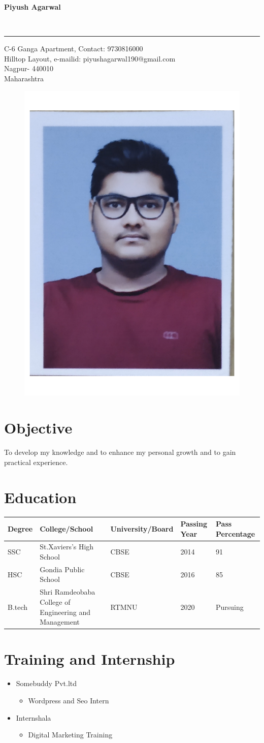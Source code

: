 \documentclass{article}
\begin{document}
	
{\begin{center}
		
	\end{center}\Huge\textbf{Piyush Agarwal}}
\\
\rule{\paperwidth}{0.2ex}
C-6 Ganga Apartment,\hspace{24ex} Contact: 9730816000
\\
Hilltop Layout, \hspace{32ex} e-mailid: piyushagarwal190@gmail.com
\\
Nagpur- 440010 
\\
Maharashtra
\begin{flushright}
	\begin{figure}[h]
		\includegraphics[width=15ex]{PIYUSH7}
	\end{figure}
\end{flushright}
\section{Objective}
{\large To develop my knowledge and to enhance my personal growth and to gain practical experience.}
\section{Education}
\begin{tabular}{ |p{3cm}|p{3cm}|p{3cm}|p{2cm}|p{3cm}| }
	\hline
	Degree& College/School &University/Board &Passing Year &Pass Percentage 
	\\
	\hline
	\hline
	SSC & St.Xaviers's High School &CBSE &2014 &91 \\
	\hline
	HSC & Gondia Public School   & CBSE &2016 &85 \\
	\hline
	B.tech &Shri Ramdeobaba College of Engineering and Management & RTMNU &2020 &Pursuing \\
	\hline
\end{tabular}
\section{Training and Internship}
\begin{itemize}
	\item{ Somebuddy Pvt.ltd
		\begin{itemize}
			\item Wordpress and Seo Intern
	\end{itemize}}
	\item { Internshala
		\begin{itemize}
			\item Digital Marketing Training
	\end{itemize}}
\end{itemize}
\end{document}
